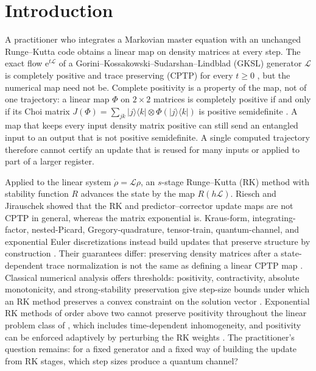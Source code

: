 \documentclass[pdflatex,sn-mathphys-num]{sn-jnl}
\newcommand{\e}{\mathrm{e}}
\newcommand{\Lgen}{\mathcal L}
\theoremstyle{thmstyleone}
\theoremstyle{thmstylethree}
\theoremstyle{thmstyletwo}
\begin{document}

\maketitle

\section{Introduction}\label{sec:intro}

A practitioner who integrates a Markovian master equation with an unchanged Runge--Kutta code obtains a linear map on density matrices at every step. The exact flow $\e^{t\Lgen}$ of a Gorini--Kossakowski--Sudarshan--Lindblad (GKSL) generator $\Lgen$ is completely positive and trace preserving (CPTP) for every $t\ge0$ \cite{Lindblad1976,GoriniKossakowskiSudarshan1976,BreuerPetruccione2002}, but the numerical map need not be. Complete positivity is a property of the map, not of one trajectory: a linear map $\Phi$ on $2\times2$ matrices is completely positive if and only if its Choi matrix $J(\Phi)=\sum_{jk}|j\rangle\langle k|\otimes\Phi(|j\rangle\langle k|)$ is positive semidefinite \cite{Choi1975CP,Kraus1971}. A map that keeps every input density matrix positive can still send an entangled input to an output that is not positive semidefinite. A single computed trajectory therefore cannot certify an update that is reused for many inputs or applied to part of a larger register.

Applied to the linear system $\dot\rho=\Lgen\rho$, an $s$-stage Runge--Kutta (RK) method with stability function $R$ advances the state by the map $R(h\Lgen)$. Riesch and Jirauschek \cite{RieschJirauschek2019} showed that the RK and predictor--corrector update maps are not CPTP in general, whereas the matrix exponential is. Kraus-form, integrating-factor, nested-Picard, Gregory-quadrature, tensor-train, quantum-channel, and exponential Euler discretizations instead build updates that preserve structure by construction \cite{RieschPiklJirauschek2020,CaoLu2025,AppeloCheng2025,HuAppeloCheng2025NPI,HuAppeloCheng2026Gregory,DelMastroAppeloCheng2026TT,RobinRouchonSellem2025,ChenEtAl2026}. Their guarantees differ: preserving density matrices after a state-dependent trace normalization is not the same as defining a linear CPTP map \cite{RobinRouchonSellem2025}. Classical numerical analysis offers thresholds: positivity, contractivity, absolute monotonicity, and strong-stability preservation give step-size bounds under which an RK method preserves a convex constraint on the solution vector \cite{BolleyCrouzeix1978,Kraaijevanger1991Contractivity,Horvath2005Threshold,GottliebShuTadmor2001}. Exponential RK methods of order above two cannot preserve positivity throughout the linear problem class of \cite{OstermannVanDaele2007}, which includes time-dependent inhomogeneity, and positivity can be enforced adaptively by perturbing the RK weights \cite{NussleinRanochaKetcheson2021}. The practitioner's question remains: for a fixed generator and a fixed way of building the update from RK stages, which step sizes produce a quantum channel?
\end{document}
